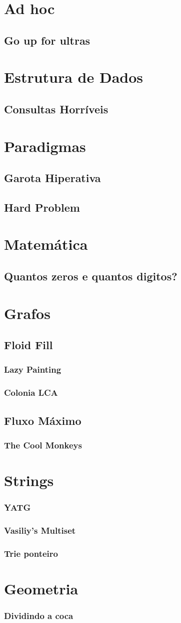 \documentclass[a4paper,12pt]{article}
\newcommand\includes[4]{
   \subsection{#2}
   
}
\newcommand\includess[4]{
   \subsubsection{#2}
   
}
\begin{document}
\tableofcontents
\thispagestyle{fancy}
\newpage
\begin{multicols}{2}

\section{Ad hoc}
\includes{c++}{Go up for ultras}{adhoc}{ultra.cpp}

\section{Estrutura de Dados}
\includes{c++}{Consultas Horríveis}{ed}{horrivel.cpp}
\section{Paradigmas}
\includes{c++}{Garota Hiperativa}{paradigma}{hiper.cpp}
\includes{c++}{Hard Problem}{paradigma}{hard.cpp}

\section{Matemática}
\includes{c++}{Quantos zeros e quantos digitos?}{math}{zeros.cpp}

\section{Grafos}
\subsection{Floid Fill}
\includess{c++}{Lazy Painting}{graph}{lazypaint.cpp}
\includess{c++}{Colonia LCA}{graph}{colonia_LCA.cpp}

\subsection{Fluxo Máximo}
\includess{c++}{The Cool Monkeys}{graph}{coolMonkeys.cpp}

\section{Strings}
\includess{c++}{YATG}{strings}{YATG.cpp}
\includess{c++}{Vasiliy's Multiset}{strings}{multiset.cpp}
\includess{c++}{Trie ponteiro}{strings}{trie_ponteiro.cpp}

\section{Geometria}
\includess{c++}{Dividindo a coca}{geometria}{coca.cpp}


\end{multicols}
\end{document}
